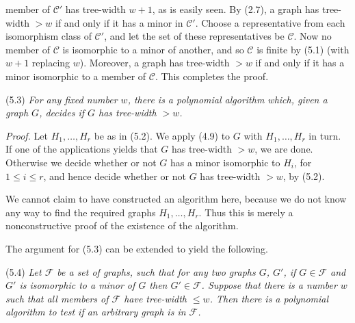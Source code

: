 \noindent member of $\mathscr{C}'$ has tree-width $w + 1$, as is easily seen. By (2.7), a graph has tree-width $> w$ if and only if it has a minor in $\mathscr{C}'$. Choose a representative from each isomorphism class of $\mathscr{C}'$, and let the set of these representatives be $\mathscr{C}$. Now no member of $\mathscr{C}$ is isomorphic to a minor of another, and so $\mathscr{C}$ is finite by (5.1) (with $w + 1$ replacing $w$). Moreover, a graph has tree-width $> w$ if and only if it has a minor isomorphic to a member of $\mathscr{C}$. This completes the proof.

\stmt
(5.3) \textit{For any fixed number $w$, there is a polynomial algorithm which, given a graph $G$, decides if $G$ has tree-width $> w$.}

\textit{Proof.} Let $H_1, \dots, H_r$ be as in (5.2). We apply (4.9) to $G$ with $H_1, \dots, H_r$ in turn. If one of the applications yields that $G$ has tree-width $> w$, we are done. Otherwise we decide whether or not $G$ has a minor isomorphic to $H_i$, for $1 \le i \le r$, and hence decide whether or not $G$ has tree-width $> w$, by (5.2).

We cannot claim to have constructed an algorithm here, because we do not know any way to find the required graphs $H_1, \dots, H_r$. Thus this is merely a nonconstructive proof of the existence of the algorithm.

The argument for (5.3) can be extended to yield the following.

\stmt
(5.4) \textit{Let $\mathscr{F}$ be a set of graphs, such that for any two graphs $G$, $G'$, if $G \in \mathscr{F}$ and $G'$ is isomorphic to a minor of $G$ then $G' \in \mathscr{F}$. Suppose that there is a number $w$ such that all members of $\mathscr{F}$ have tree-width $\le w$. Then there is a polynomial algorithm to test if an arbitrary graph is in $\mathscr{F}$.}


